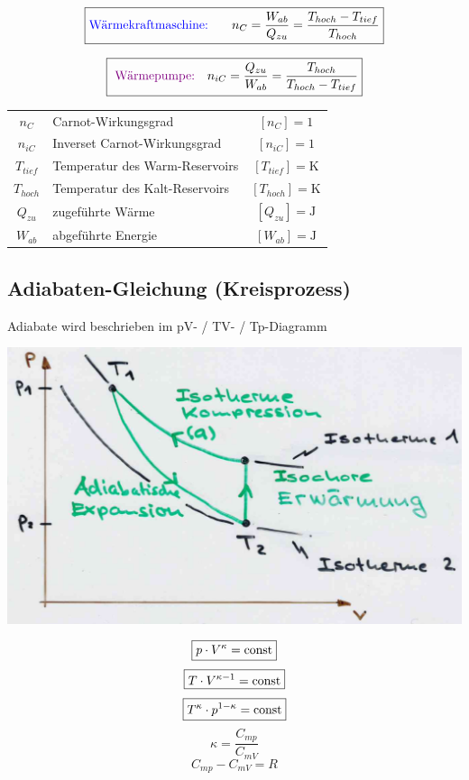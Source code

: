 $$ \boxed{\text{\textcolor{blue}{Wärmekraftmaschine: } }  \quad n_C = \frac{W_{ab}}{Q_{zu}} = \frac{T_{hoch}-T_{tief}}{T_{hoch}} }  $$


$$ \boxed{\text{ \textcolor{violet}{Wärmepumpe:}} \quad  n_{iC} = \frac{Q_{zu}}{W_{ab}} = \frac{T_{hoch}}{T_{hoch}-T_{tief}} }  $$



\begin{tabular}{c l c}
	$n_C$ & Carnot-Wirkungsgrad & $[n_C] = \mathrm{1}$ \\
	$n_{iC}$ & Inverset Carnot-Wirkungsgrad & $[n_{iC}] = \mathrm{1}$ \\
	$T_{tief}$ & Temperatur des Warm-Reservoirs & $[T_{tief}] = \mathrm{K}$ \\
	$T_{hoch}$ & Temperatur des Kalt-Reservoirs & $[T_{hoch}] = \mathrm{K}$  \\
	$Q_{zu}$ & zugeführte Wärme & $[Q_{zu}] = \mathrm{J}$ \\ 
	$W_{ab}$ & abgeführte Energie & $[W_{ab}] = \mathrm{J}$ \\ 
\end{tabular}





\vfill\null
\columnbreak


\subsection{Adiabaten-Gleichung (Kreisprozess)}
Adiabate wird beschrieben im pV- / TV- / Tp-Diagramm
\\


\begin{minipage}{0.6\linewidth}
\includegraphics[width=\linewidth]{Bilder/kreisprozess}
\end{minipage}
\hfill
\begin{minipage}{0.38\linewidth}
$$ \boxed{ p \cdot V^\kappa  = \mathrm{const} } $$
$$ \boxed{ T \cdot V^{\kappa -1} = \mathrm{const} } $$
$$ \boxed{ T^\kappa \cdot p^{1-\kappa} = \mathrm{const} } $$
$$ \kappa = \frac{C_{mp}}{C_{mV}}$$
$$ \boxed{ C_{mp} - C_{mV} = R }$$
\\
\end{minipage}




